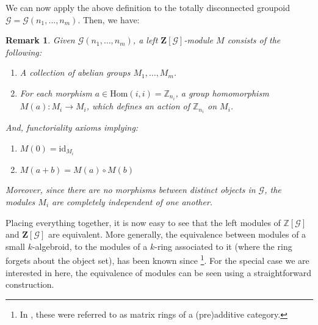\documentclass[a4paper,12pt]{article}
\newtheorem{remark}{Remark}[section]
\newcommand{\Z}{\mathbb{Z}}
\newcommand{\Zb}{\mathbf{Z}}
\newcommand{\calG}{\mathcal{G}}
\newcommand{\Hom}{\mathrm{Hom}}
\begin{document}
We can now apply the above definition to the totally disconnected groupoid  $\calG = \calG(n_1, \ldots, n_m)$.   Then, we have:   
\begin{remark} 
\label{remZbmod}
Given $\calG(n_1, \ldots, n_m)$,  a left $\Zb[\calG]$-module $M$  consists of the following:    
\begin{enumerate}  
  \item A collection of abelian groups $M_1, \ldots, M_m$.
  \item For each morphism $a \in \Hom(i,i) = \Z_{n_i}$,  a group homomorphism
$M(a) : M_i \to M_i$, which defines an action of $\Z_{n_i}$ on $M_i$.  
\end{enumerate}

And, functoriality axioms implying:       
\begin{enumerate}
  \item $M(0) = \mathrm{id}_{M_i}$ 
  \item $M(a+b) = M(a) \circ M(b)$ 
\end{enumerate}
 
Moreover, since there are no morphisms between distinct objects in $\calG$, the  modules $M_i$ are completely independent of one another.
\end{remark}



Placing everything together, it is now easy to see that the left modules of $\Z[\calG]$ and $\Zb[\calG]$ are equivalent. More generally, the equivalence between modules of a small $k$-algebroid, to the modules of a $k$-ring associated to it (where the ring forgets about the object set), has been known since \cite{Mitchell1972, mitchell1985}\footnote{In \cite{Mitchell1972}, these were referred to as matrix rings of a (pre)additive category.}. For the special case we are interested in here, the equivalence of modules can be seen using a straightforward construction.  
\end{document}
